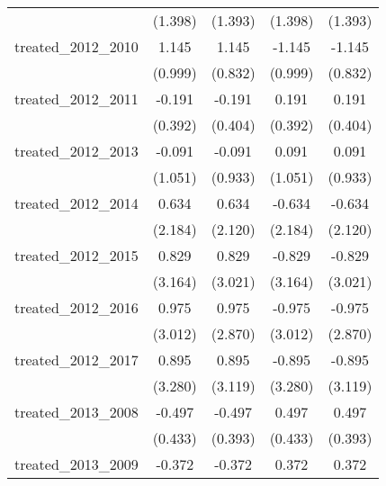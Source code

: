 {\begin{tabular}{l*{4}{c}}
            &     (1.398)         &     (1.393)         &     (1.398)         &     (1.393)         \\
[1em]
treated\_2012\_2010&       1.145         &       1.145         &      -1.145         &      -1.145         \\
            &     (0.999)         &     (0.832)         &     (0.999)         &     (0.832)         \\
[1em]
treated\_2012\_2011&      -0.191         &      -0.191         &       0.191         &       0.191         \\
            &     (0.392)         &     (0.404)         &     (0.392)         &     (0.404)         \\
[1em]
treated\_2012\_2013&      -0.091         &      -0.091         &       0.091         &       0.091         \\
            &     (1.051)         &     (0.933)         &     (1.051)         &     (0.933)         \\
[1em]
treated\_2012\_2014&       0.634         &       0.634         &      -0.634         &      -0.634         \\
            &     (2.184)         &     (2.120)         &     (2.184)         &     (2.120)         \\
[1em]
treated\_2012\_2015&       0.829         &       0.829         &      -0.829         &      -0.829         \\
            &     (3.164)         &     (3.021)         &     (3.164)         &     (3.021)         \\
[1em]
treated\_2012\_2016&       0.975         &       0.975         &      -0.975         &      -0.975         \\
            &     (3.012)         &     (2.870)         &     (3.012)         &     (2.870)         \\
[1em]
treated\_2012\_2017&       0.895         &       0.895         &      -0.895         &      -0.895         \\
            &     (3.280)         &     (3.119)         &     (3.280)         &     (3.119)         \\
[1em]
treated\_2013\_2008&      -0.497         &      -0.497         &       0.497         &       0.497         \\
            &     (0.433)         &     (0.393)         &     (0.433)         &     (0.393)         \\
[1em]
treated\_2013\_2009&      -0.372         &      -0.372         &       0.372         &       0.372         \\

\end{tabular}}
